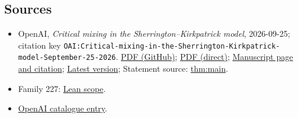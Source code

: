 \documentclass[11pt]{article}
\begin{document}
\subsection{Sources}
\begin{itemize}
\item OpenAI, \emph{Critical mixing in the Sherrington–Kirkpatrick model}, 2026-09-25; citation key \texttt{OAI:Critical-mixing-in-the-Sherrington-Kirkpatrick-model-September-25-2026}. \href{https://github.com/openai/math/blob/adc7f1241b42e322a6451854ab7e4b4c146bf78a/preprints/Critical-mixing-in-the-Sherrington-Kirkpatrick-model-September-25-2026/paper.pdf}{PDF (GitHub)}; \href{https://github.com/openai/math/raw/adc7f1241b42e322a6451854ab7e4b4c146bf78a/preprints/Critical-mixing-in-the-Sherrington-Kirkpatrick-model-September-25-2026/paper.pdf}{PDF (direct)}; \href{https://github.com/openai/math/blob/adc7f1241b42e322a6451854ab7e4b4c146bf78a/preprints/Critical-mixing-in-the-Sherrington-Kirkpatrick-model-September-25-2026/README.md}{Manuscript page and citation}; \href{https://github.com/openai/math/blob/main/preprints/Critical-mixing-in-the-Sherrington-Kirkpatrick-model-September-25-2026/paper.pdf}{Latest version}; Statement source: \href{https://github.com/openai/math/blob/adc7f1241b42e322a6451854ab7e4b4c146bf78a/preprints/Critical-mixing-in-the-Sherrington-Kirkpatrick-model-September-25-2026/build/sections/introduction.tex\#L54}{thm:main}.
\item Family 227: \href{https://github.com/openai/math/blob/adc7f1241b42e322a6451854ab7e4b4c146bf78a/lean/docs/227.md}{Lean scope}.
\item \href{https://github.com/openai/math/blob/adc7f1241b42e322a6451854ab7e4b4c146bf78a/CONTENTS.md}{OpenAI catalogue entry}.
\end{itemize}
\end{document}
